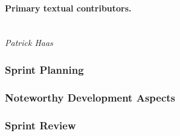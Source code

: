 \paragraph{Primary textual contributors.}
\mbox{}\\\emph{Patrick Haas}

\subsubsection{Sprint Planning}


\subsubsection{Noteworthy Development Aspects}


\subsubsection{Sprint Review}

